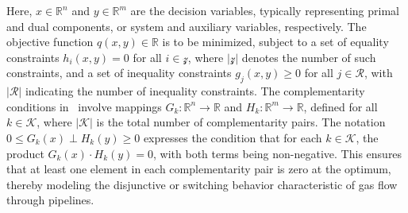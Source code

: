 


\noindent Here, \( x \in \mathbb{R}^n \) and \( y \in \mathbb{R}^m \) are the decision variables, typically representing primal and dual components, or system and auxiliary variables, respectively. The objective function \( q(x, y) \in \mathbb{R} \) is to be minimized, subject to a set of equality constraints \( h_i(x, y) = 0 \) for all \( i \in \mathcal{z} \), where \( |\mathcal{z}| \) denotes the number of such constraints, and a set of inequality constraints \( g_j(x, y) \geq 0 \) for all \( j \in \mathcal{R} \), with \( |\mathcal{R}| \) indicating the number of inequality constraints. The complementarity conditions in~ involve mappings \( G_k: \mathbb{R}^n \to \mathbb{R} \) and \( H_k: \mathbb{R}^m \to \mathbb{R} \), defined for all \( k \in \mathcal{K} \), where \( |\mathcal{K}| \) is the total number of complementarity pairs. The notation \( 0 \leq G_k(x) \perp H_k(y) \geq 0 \) expresses the condition that for each \( k \in \mathcal{K} \), the product \( G_k(x) \cdot H_k(y) = 0 \), with both terms being non-negative. This ensures that at least one element in each complementarity pair is zero at the optimum, thereby modeling the disjunctive or switching behavior characteristic of gas flow through pipelines.

